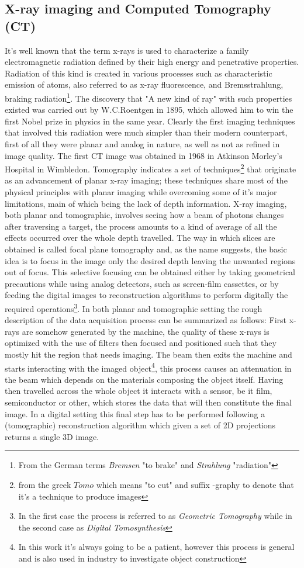\subsection{X-ray imaging and Computed Tomography (CT)}
It's well known that the term x-rays is used to characterize a family electromagnetic radiation defined by their high energy and penetrative properties. Radiation of this kind is created in various processes such as characteristic emission of atoms, also referred to as x-ray fluorescence, and Bremsstrahlung, braking radiation\footnote{From the German terms \textit{Bremsen} "to brake" and \textit{Strahlung} "radiation"}. The discovery that "A new kind of ray"\cite{Roentgen} with such properties existed was carried out by W.C.Roentgen in 1895, which allowed him to win the first Nobel prize in physics in the same year. Clearly the first imaging techniques that involved this radiation were much simpler than their modern counterpart, first of all they were planar and analog in nature, as well as not as refined in image quality. The first CT image was obtained in 1968 in Atkinson Morley's Hospital in Wimbledon. Tomography indicates a set of techniques\footnote{from the greek $\textit{Tomo}$ which means "to cut" and suffix -graphy to denote that it's a technique to produce images} that originate as an advancement of planar x-ray imaging; these techniques share most of the physical principles with planar imaging while overcoming some of it's major limitations, main of which being the lack of depth information.  X-ray imaging, both planar and tomographic, involves seeing how a beam of photons changes after traversing a target, the process amounts to a kind of average of all the effects occurred over the whole depth travelled. 
The way in which slices are obtained is called focal plane tomography and, as the name suggests, the basic idea is to focus in the image only the desired depth leaving the unwanted regions out of focus. This selective focusing can be obtained either by taking geometrical precautions while using analog detectors, such as screen-film cassettes, or by feeding the digital images to reconstruction algorithms to perform digitally the required operations\footnote{In the first case the process is referred to as \textit{Geometric Tomography} while in the second case as \textit{Digital Tomosynthesis}}.
In both planar and tomographic setting the rough description of the data acquisition process can be summarized as follows: First x-rays are somehow generated by the machine, the quality of these x-rays is optimized with the use of filters then focused and positioned such that they mostly hit the region that needs imaging. The beam then exits the machine and starts interacting with the imaged object\footnote{In this work it's always going to be a patient, however this process is general and is also used in industry to investigate object construction}, this process causes an attenuation in the beam which depends on the materials composing the object itself. Having then travelled across the whole object it interacts with a sensor, be it film, semiconductor or other, which stores the data that will then constitute the final image. In a digital setting this final step has to be performed following a (tomographic) reconstruction algorithm which given a set of 2D projections returns a single 3D image.
